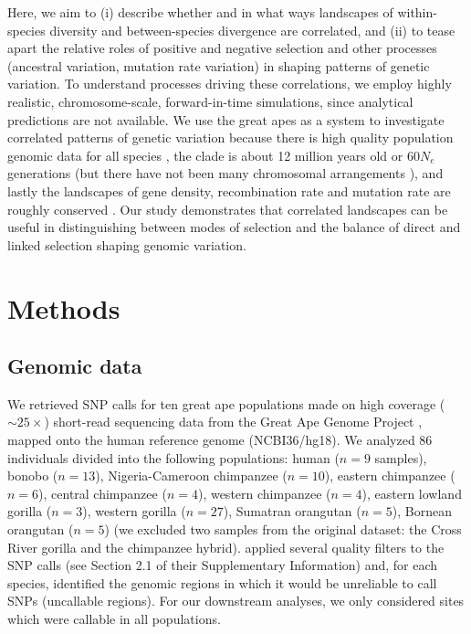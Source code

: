 
Here, we aim to (i) describe whether and in what ways landscapes of within-species diversity and between-species divergence are correlated,
and (ii) to tease apart the relative roles of positive and negative selection and other processes (\eg ancestral variation, mutation rate variation) in shaping patterns of genetic variation.
To understand processes driving these correlations, we employ highly realistic, chromosome-scale, forward-in-time simulations,
since analytical predictions are not available.
We use the great apes as a system to investigate correlated patterns of genetic variation because
there is high quality population genomic data for all species \parencite{prado-martinez_great_2013},
the clade is about 12 million years old or $60 N_e$ generations (but there have not been many chromosomal arrangements \cite{jauch_reconstruction_1992}),
and lastly the landscapes of gene density, recombination rate and mutation rate are roughly conserved \parencite{kronenberg_high-resolution_2018,stevison_time_2016}.
Our study demonstrates that correlated landscapes can be useful in distinguishing between modes of selection and the balance of direct and linked selection shaping genomic variation.

\section{Methods} \label{sec:methods}

\subsection{Genomic data}

We retrieved SNP calls for ten great ape populations made on high coverage (${\sim}25\times$) short-read sequencing data from the Great Ape Genome Project \citep{prado-martinez_great_2013},
mapped onto the human reference genome (NCBI36/hg18).
We analyzed 86 individuals divided into the following populations: 
human ($n=9$ samples), bonobo ($n=13$), Nigeria-Cameroon chimpanzee ($n=10$), eastern chimpanzee ($n=6$), central chimpanzee ($n=4$), western chimpanzee ($n=4$), eastern lowland gorilla ($n=3$), western gorilla ($n=27$), Sumatran orangutan ($n=5$), Bornean orangutan ($n=5$) (we excluded two samples from the original dataset: the Cross River gorilla and the chimpanzee hybrid).
\citet{prado-martinez_great_2013} applied several quality filters to the SNP calls (see Section 2.1 of their Supplementary Information) and, 
for each species, identified the genomic regions in which it would be unreliable to call SNPs (uncallable regions).
For our downstream analyses, we only considered sites which were callable in all populations.


